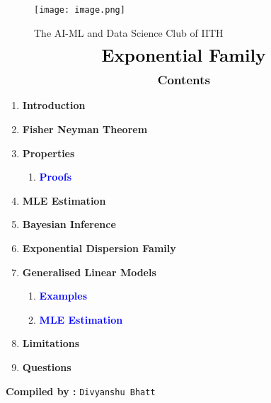 \documentclass{homework}
\begin{document}
\begin{center}
\begin{figure}[h]
\centering
\texttt{[image: image.png]}
\caption*{{{\selectfont The AI-ML and Data Science Club of IITH}}}
\end{figure}
\end{center}
\begin{align*}
{\LARGE{\textbf{Exponential Family}}}
\end{align*}
\graphicspath{{./media/}}
\begin{align*}
\large{\textbf{{Contents}}}
\end{align*}


\renewcommand{\labelenumii}{\arabic{enumi}.\arabic{enumii}}
\renewcommand{\labelenumiii}{\arabic{enumi}.\arabic{enumii}.\arabic{enumiii}}
\renewcommand{\labelenumiv}{\arabic{enumi}.\arabic{enumii}.\arabic{enumiii}.\arabic{enumiv}}

\begin{enumerate}
\item \textbf{Introduction}
\item \textbf{Fisher Neyman Theorem}
\item \textbf{Properties}
\begin{enumerate}
    \item \textbf{\textcolor{blue}{Proofs}}
\end{enumerate}
\item \textbf{MLE Estimation}
\item \textbf{Bayesian Inference}
\item \textbf{Exponential Dispersion Family}
\item \textbf{Generalised Linear Models}
\begin{enumerate}
    \item \textbf{\textcolor{blue}{Examples}}
    \item \textbf{\textcolor{blue}{MLE Estimation}}
\end{enumerate}
\item \textbf{Limitations}
\item \textbf{Questions}
\end{enumerate}


\begin{center}
    {\textbf{Compiled by :}
    \texttt{Divyanshu Bhatt}}
\end{center}

\newpage
\section{}
\end{document}
